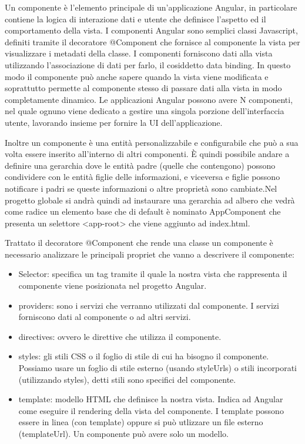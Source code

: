 Un componente è l’elemento principale di un’applicazione Angular, in particolare contiene la logica di interazione dati e utente che definisce l’aspetto ed il comportamento della vista.
I componenti Angular sono semplici classi Javascript, definiti tramite il decoratore @Component che fornisce al componente la vista per visualizzare i metadati della classe. I componenti forniscono dati alla vista utilizzando l’associazione di dati per farlo, il cosiddetto data binding. In questo modo il componente può anche sapere quando la vista viene modificata e soprattutto permette al componente stesso di passare dati alla vista in modo completamente dinamico. Le applicazioni Angular possono avere N componenti, nel quale ognuno viene dedicato a gestire una singola porzione dell’interfaccia utente, lavorando insieme per fornire la UI dell’applicazione.

Inoltre un componente è una entità personalizzabile e configurabile che può a sua volta essere inserito all'interno di altri componenti. È quindi possibile andare a definire una gerarchia dove le entità padre (quelle che contengono) possono condividere con le entità figlie delle informazioni, e viceversa e figlie possono notificare i padri se queste informazioni o altre proprietà sono cambiate.Nel progetto globale si andrà quindi ad instaurare una gerarchia ad albero che vedrà come radice un elemento base che di default è nominato AppComponent che presenta un selettore <app-root> che viene aggiunto ad index.html.

Trattato il decoratore @Component che rende una classe un componente è necessario analizzare le principali propriet che vanno a descrivere il componente:
\begin{itemize}
\item Selector: specifica un tag tramite il quale la nostra vista che rappresenta il componente viene posizionata nel progetto Angular.
\item providers: sono i servizi che verranno utilizzati dal componente. I servizi forniscono dati al componente o ad altri servizi.
\item directives: ovvero le direttive che utilizza il componente.
\item styles: gli stili CSS o il foglio di stile di cui ha bisogno il componente. Possiamo usare un foglio di stile esterno (usando styleUrls) o stili incorporati (utilizzando styles), detti stili sono specifici del componente.
\item template: modello HTML che definisce la nostra vista. Indica ad Angular come eseguire il rendering della vista del componente. I template possono essere in linea (con template) oppure si può utlizzare un file esterno (templateUrl). Un componente può avere solo un modello.
\end{itemize}
 
